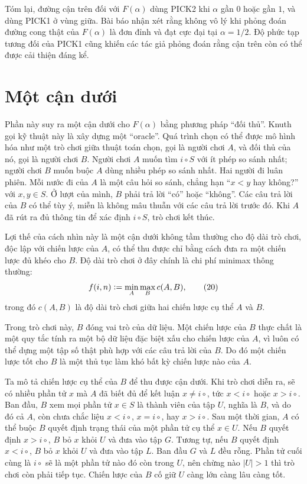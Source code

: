 \documentclass[11pt]{article}
\newcommand{\PICKone}{\textsc{PICK1}}
\newcommand{\PICKtwo}{\textsc{PICK2}}
\newcommand{\defeq}{\mathrel{\vcentcolon=}}
\begin{document}
Tóm lại, đường cận trên đối với \(F(\alpha)\) dùng \PICKtwo{} khi
\(\alpha\) gần \(0\) hoặc gần \(1\), và dùng \PICKone{} ở vùng giữa. Bài báo
nhận xét rằng không vô lý khi phỏng đoán đường cong thật của \(F(\alpha)\) là
đơn đỉnh và đạt cực đại tại
\(\alpha=1/2\). Độ phức tạp tương đối của \PICKone{} cũng khiến các tác giả
phỏng đoán rằng cận trên còn có thể được cải thiện đáng kể.

\section{Một cận dưới}

Phần này suy ra một cận dưới cho \(F(\alpha)\) bằng phương pháp ``đối thủ''.
Knuth gọi kỹ thuật này là xây dựng một ``oracle''. Quá trình chọn có thể được
mô hình hóa như một trò chơi giữa thuật toán chọn, gọi là người chơi \(A\), và
đối thủ của nó, gọi là người chơi \(B\). Người chơi \(A\) muốn tìm \(i\circ S\)
với ít phép so sánh nhất; người chơi \(B\) muốn buộc \(A\) dùng nhiều phép so
sánh nhất. Hai người đi luân phiên. Mỗi nước đi của \(A\) là một câu hỏi so
sánh, chẳng hạn ``\(x<y\) hay không?'' với \(x,y\in S\). Ở lượt của mình,
\(B\) phải trả lời ``có'' hoặc ``không''. Các câu trả lời của \(B\) có thể tùy
ý, miễn là không mâu thuẫn với các câu trả lời trước đó. Khi \(A\) đã rút ra
đủ thông tin để xác định \(i\circ S\), trò chơi kết thúc.

Lợi thế của cách nhìn này là một cận dưới không tầm thường cho độ dài trò
chơi, độc lập với chiến lược của \(A\), có thể thu được chỉ bằng cách đưa ra
một chiến lược đủ khéo cho \(B\). Độ dài trò chơi ở đây chính là chi phí
minimax thông thường:
\[
  f(i,n)\defeq \min_A\max_B c(A,B),
  \tag{20}
\]
trong đó \(c(A,B)\) là độ dài trò chơi giữa hai chiến lược cụ thể \(A\) và
\(B\).

Trong trò chơi này, \(B\) đóng vai trò của dữ liệu. Một chiến lược của \(B\)
thực chất là một quy tắc tính ra một bộ dữ liệu đặc biệt xấu cho chiến lược
của \(A\), vì luôn có thể dựng một tập số thật phù hợp với các câu trả lời của
\(B\). Do đó một chiến lược tốt cho \(B\) là một thủ tục làm khó bất kỳ chiến
lược nào của \(A\).

Ta mô tả chiến lược cụ thể của \(B\) để thu được cận dưới. Khi trò chơi diễn
ra, sẽ có nhiều phần tử \(x\) mà \(A\) đã biết đủ để kết luận \(x\ne i\circ\),
tức \(x<i\circ\) hoặc \(x>i\circ\). Ban đầu, \(B\) xem mọi phần tử \(x\in S\)
là thành viên của tập \(U\), nghĩa là \(B\), và do đó cả \(A\), còn chưa chắc
liệu \(x<i\circ\), \(x=i\circ\), hay \(x>i\circ\). Sau một thời gian, \(A\) có
thể buộc \(B\) quyết định trạng thái của một phần tử cụ thể \(x\in U\). Nếu
\(B\) quyết định \(x>i\circ\), \(B\) bỏ \(x\) khỏi \(U\) và đưa vào tập \(G\).
Tương tự, nếu \(B\) quyết định \(x<i\circ\), \(B\) bỏ \(x\) khỏi \(U\) và đưa
vào tập \(L\). Ban đầu \(G\) và \(L\) đều rỗng. Phần tử cuối cùng là
\(i\circ\) sẽ là một phần tử nào đó còn trong \(U\), nên chừng nào \(|U|>1\)
thì trò chơi còn phải tiếp tục. Chiến lược của \(B\) cố giữ \(U\) càng lớn
càng lâu càng tốt.
\end{document}
